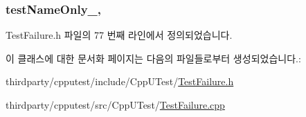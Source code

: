 \subsubsection[{\texorpdfstring{test\+Name\+Only\+\_\+}{testNameOnly_}}]{ test\+Name\+Only\+\_\+\hspace{0.3cm}{\ttfamily [protected]}, {\ttfamily [inherited]}}\hypertarget{class_test_failure_a60a0b2466b44483497e83d73b70241f2}{}\label{class_test_failure_a60a0b2466b44483497e83d73b70241f2}


Test\+Failure.\+h 파일의 77 번째 라인에서 정의되었습니다.



이 클래스에 대한 문서화 페이지는 다음의 파일들로부터 생성되었습니다.\+:\begin{DoxyCompactItemize}
\item 
thirdparty/cpputest/include/\+Cpp\+U\+Test/\hyperlink{_test_failure_8h}{Test\+Failure.\+h}\item 
thirdparty/cpputest/src/\+Cpp\+U\+Test/\hyperlink{_test_failure_8cpp}{Test\+Failure.\+cpp}\end{DoxyCompactItemize}
